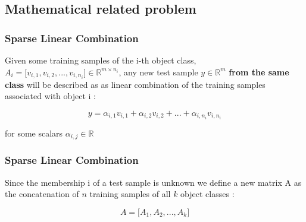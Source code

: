 \documentclass{beamer}
\begin{document}

	
	\subsection{Mathematical related problem}
	
	
		\begin{frame}
		\frametitle{Sparse Linear Combination}

Given some training samples of the i-th object class, $A_{i}=\lbrack v_{i,1},v_{i,2},...,v_{i,n_{i}} \rbrack \in \mathbb{R}^{m \times n_{i}} $, any new test sample $y \in \mathbb{R}^{m}$ \textbf{from the same class} will be described as as linear combination of the training samples associated with object i :

$$y=\alpha_{i,1}v_{i,1}+\alpha_{i,2}v_{i,2}+...+\alpha_{i,n_{i}}v_{i,n_{i}}$$

for some scalars $\alpha_{i,j} \in \mathbb{R}$

		\end{frame}

		\begin{frame}
		\frametitle{Sparse Linear Combination}

Since the membership i of a test sample is unknown we define a new matrix A as the concatenation of $n$ training samples of all $k$ object classes :

$$A=\lbrack A_{1},A_{2},...,A_{k} \rbrack $$



		\end{frame}

		
\end{document}
